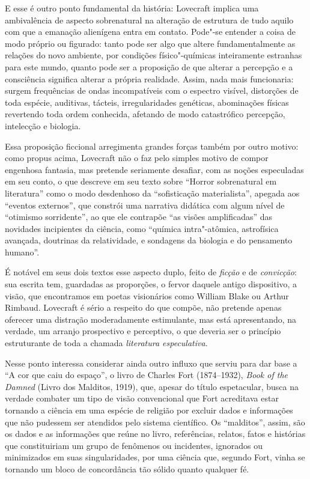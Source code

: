 E esse é outro ponto fundamental da história: Lovecraft implica uma
ambivalência de aspecto sobrenatural na alteração de estrutura de tudo
aquilo com que a emanação alienígena entra em contato. Pode"-se entender
a coisa de modo próprio ou figurado: tanto pode ser algo que altere
fundamentalmente as relações do novo ambiente, por condições
físico"-químicas inteiramente estranhas para este mundo, quanto pode ser
a proposição de que alterar a percepção e a consciência significa
alterar a própria realidade. Assim, nada mais funcionaria: surgem
frequências de ondas incompatíveis com o espectro visível, distorções de
toda espécie, auditivas, tácteis, irregularidades genéticas, abominações
físicas revertendo toda ordem conhecida, afetando de modo catastrófico
percepção, intelecção e biologia.

Essa proposição ficcional arregimenta grandes forças também por outro
motivo: como propus acima, Lovecraft não o faz pelo simples motivo de
compor engenhosa fantasia, mas pretende seriamente desafiar, com as
noções especuladas em seu conto, o que descreve em seu texto sobre
``Horror sobrenatural em literatura'' como o modo desdenhoso da
``sofisticação materialista'', apegada aos ``eventos externos'', que
constrói uma narrativa didática com algum nível de ``otimismo
sorridente'', ao que ele contrapõe ``as visões amplificadas'' das
novidades incipientes da ciência, como ``química intra"-atômica,
astrofísica avançada, doutrinas da relatividade, e sondagens da biologia
e do pensamento humano''.

É notável em seus dois textos esse aspecto duplo, feito de \emph{ficção}
e de \emph{convicção}: sua escrita tem, guardadas as proporções, o
fervor daquele antigo dispositivo, a visão, que encontramos em poetas
visionários como William Blake ou Arthur Rimbaud. Lovecraft é sério a
respeito do que compõe, não pretende apenas oferecer uma distração
moderadamente estimulante, mas está apresentando, na verdade, um arranjo
prospectivo e perceptivo, o que deveria ser o princípio estruturante de
toda a chamada \emph{literatura especulativa}.

Nesse ponto interessa considerar ainda outro influxo que serviu para dar
base a ``A cor que caiu do espaço'', o livro de Charles Fort
(1874--1932), \emph{Book of the Damned} (Livro dos Malditos, 1919), que,
apesar do título espetacular, busca na verdade combater um tipo de visão
convencional que Fort acreditava estar tornando a ciência em uma espécie
de religião por excluir dados e informações que não pudessem ser
atendidos pelo sistema científico. Os ``malditos'', assim, são os dados
e as informações que reúne no livro, referências, relatos, fatos e
histórias que constituiriam um grupo de fenômenos ou incidentes,
ignorados ou minimizados em suas singularidades, por uma ciência que,
segundo Fort, vinha se tornando um bloco de concordância tão sólido
quanto qualquer fé.

